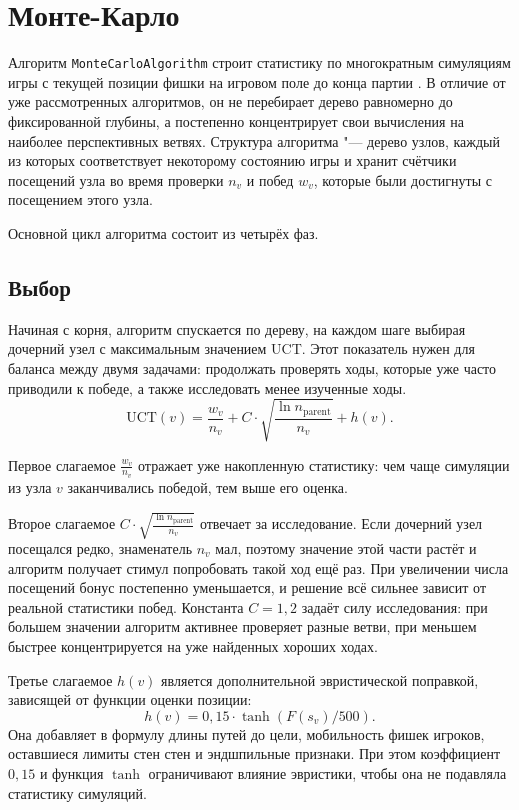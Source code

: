 \documentclass[a4paper,12pt]{diplom}
\begin{document}
\section{Монте-Карло}

Алгоритм \texttt{MonteCarloAlgorithm} строит статистику по многократным симуляциям игры с текущей позиции фишки на игровом поле до конца партии \cite{Coulom:2006}. В отличие от уже рассмотренных алгоритмов, он не перебирает дерево равномерно до фиксированной глубины, а постепенно концентрирует свои вычисления на наиболее перспективных ветвях. Структура алгоритма "--- дерево узлов, каждый из которых соответствует некоторому состоянию игры и хранит счётчики посещений узла во время проверки $n_v$ и побед $w_v$, которые были достигнуты с посещением этого узла.

Основной цикл алгоритма состоит из четырёх фаз.
\subsection{Выбор}
Начиная с корня, алгоритм спускается по дереву, на каждом шаге выбирая дочерний узел с максимальным значением UCT. Этот показатель нужен для баланса между двумя задачами: продолжать проверять ходы, которые уже часто приводили к победе, а также исследовать менее изученные ходы.
\begin{equation}
\mathrm{UCT}(v) = \frac{w_v}{n_v} + C \cdot \sqrt{\frac{\ln n_{\mathrm{parent}}}{n_v}} + h(v).
\end{equation}

Первое слагаемое $\frac{w_v}{n_v}$ отражает уже накопленную статистику: чем чаще симуляции из узла $v$ заканчивались победой, тем выше его оценка.

Второе слагаемое $C \cdot \sqrt{\frac{\ln n_{\mathrm{parent}}}{n_v}}$ отвечает за исследование. Если дочерний узел посещался редко, знаменатель $n_v$ мал, поэтому значение этой части растёт и алгоритм получает стимул попробовать такой ход ещё раз. При увеличении числа посещений бонус постепенно уменьшается, и решение всё сильнее зависит от реальной статистики побед. Константа $C = 1{,}2$ задаёт силу исследования: при большем значении алгоритм активнее проверяет разные ветви, при меньшем быстрее концентрируется на уже найденных хороших ходах.

Третье слагаемое $h(v)$ является дополнительной эвристической поправкой, зависящей от функции оценки позиции:
\[
h(v) = 0{,}15 \cdot \tanh(F(s_v) / 500).
\]
Она добавляет в формулу длины путей до цели, мобильность фишек игроков, оставшиеся лимиты стен стен и эндшпильные признаки. При этом коэффициент $0{,}15$ и функция $\tanh$ ограничивают влияние эвристики, чтобы она не подавляла статистику симуляций.
\end{document}
